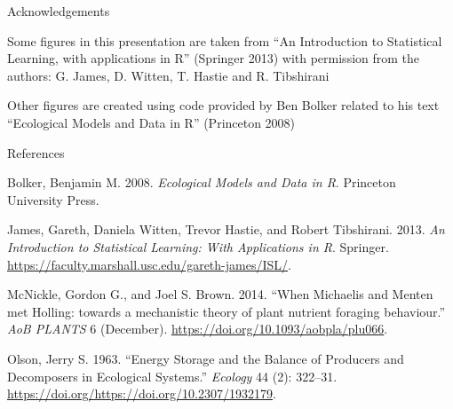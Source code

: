 \documentclass[
  ignorenonframetext,
]{beamer}
\begin{document}
\begin{frame}{Acknowledgements}
\protect\hypertarget{acknowledgements}{}

Some figures in this presentation are taken from ``An Introduction to
Statistical Learning, with applications in R'' (Springer 2013) with
permission from the authors: G. James, D. Witten, T. Hastie and R.
Tibshirani

Other figures are created using code provided by Ben Bolker related to
his text ``Ecological Models and Data in R'' (Princeton 2008)

\end{frame}

\begin{frame}{References}
\protect\hypertarget{references}{}

\hypertarget{refs}{}
\leavevmode\hypertarget{ref-bolker}{}%
Bolker, Benjamin M. 2008. \emph{Ecological Models and Data in R}.
Princeton University Press.

\leavevmode\hypertarget{ref-islr}{}%
James, Gareth, Daniela Witten, Trevor Hastie, and Robert Tibshirani.
2013. \emph{An Introduction to Statistical Learning: With Applications
in R}. Springer.
\url{https://faculty.marshall.usc.edu/gareth-james/ISL/}.

\leavevmode\hypertarget{ref-mcnickle}{}%
McNickle, Gordon G., and Joel S. Brown. 2014. ``When Michaelis and
Menten met Holling: towards a mechanistic theory of plant nutrient
foraging behaviour.'' \emph{AoB PLANTS} 6 (December).
\url{https://doi.org/10.1093/aobpla/plu066}.

\leavevmode\hypertarget{ref-olson}{}%
Olson, Jerry S. 1963. ``Energy Storage and the Balance of Producers and
Decomposers in Ecological Systems.'' \emph{Ecology} 44 (2): 322--31.
\url{https://doi.org/https://doi.org/10.2307/1932179}.

\end{frame}
\end{document}
